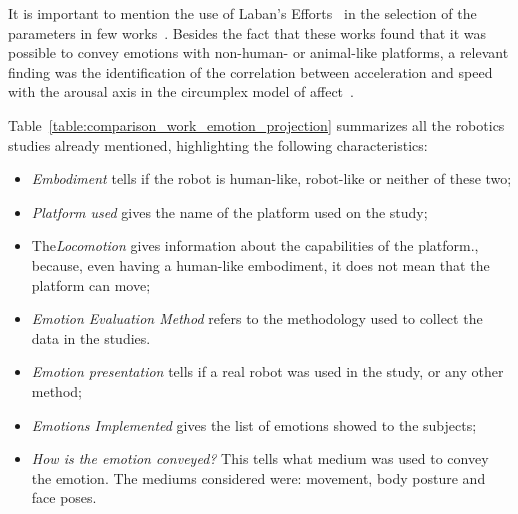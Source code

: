 It is important to mention the use of Laban’s Efforts~\cite{Laban1968} in the selection of the parameters in few works~\cite{BarakovaL10, Sharma2013}. Besides the fact that these works found that it was possible to convey emotions with non-human- or animal-like platforms, a relevant finding was the identification of the correlation between acceleration and speed with the arousal axis in the circumplex model of affect~\cite{Petta2010}.

Table~\ref{table:comparison_work_emotion_projection} summarizes all the robotics studies already mentioned, highlighting the following characteristics:
\begin{itemize}

	\item \textit{Embodiment} tells if the robot is human-like, robot-like or neither of these two;

	\item \textit{Platform used} gives the name of the platform used on the study;

	\item The\textit{Locomotion} gives information about the capabilities of the platform., because, even having a human-like embodiment, it does not mean that the platform can move;

	\item \textit{Emotion Evaluation Method} refers to the methodology used to collect the data in the studies.

	\item \textit{Emotion presentation} tells if a real robot was used in the study, or any other method;

	\item \textit{Emotions Implemented} gives the list of emotions showed to the subjects;
	
	\item \textit{How is the emotion conveyed?} This tells what medium was used to convey the emotion. The mediums considered were: movement, body posture and face poses.
	
\end{itemize}

